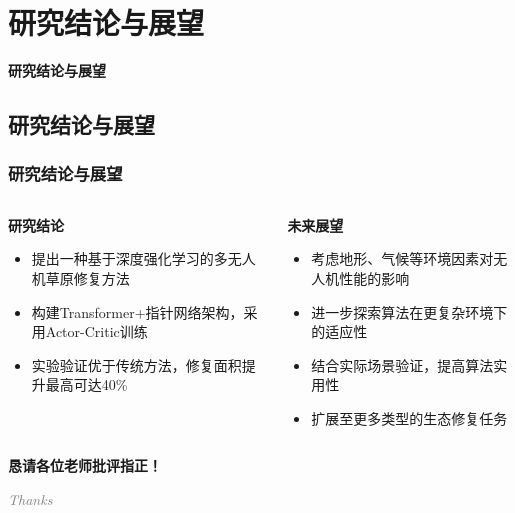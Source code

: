\documentclass[11pt, aspectratio=169]{beamer}  %
\begin{document}
\section{研究结论与展望} %
\begin{frame}
	\centering %
	{\Huge \sffamily\bfseries\textcolor{njupt}{研究结论与展望}} %
	\par %
	\vspace{0.5cm} %
\end{frame}

\subsection{研究结论与展望}
\begin{frame}
	\frametitle{研究结论与展望}
	\begin{columns}[T] %
		\begin{column}{0.5\textwidth}
			\textbf{研究结论}
			\begin{itemize}
				\item 提出一种基于深度强化学习的多无人机草原修复方法
				\item 构建Transformer+指针网络架构，采用Actor-Critic训练
				\item 实验验证优于传统方法，修复面积提升最高可达40\%
			\end{itemize}
		\end{column}
		\begin{column}{0.5\textwidth}
			\textbf{未来展望}
			\begin{itemize}
				\item 考虑地形、气候等环境因素对无人机性能的影响
				\item 进一步探索算法在更复杂环境下的适应性
				\item 结合实际场景验证，提高算法实用性
				\item 扩展至更多类型的生态修复任务
			\end{itemize}
		\end{column}
	\end{columns}
\end{frame}

\begin{frame}
	\begin{center}
		\vspace{2cm}
		{\Huge \sffamily\bfseries\textcolor{njupt}{恳请各位老师批评指正！}} %
		\vspace{0.5cm}

		{\large \itshape\textcolor{gray}{Thanks}}
	\end{center}
\end{frame}
\end{document}
